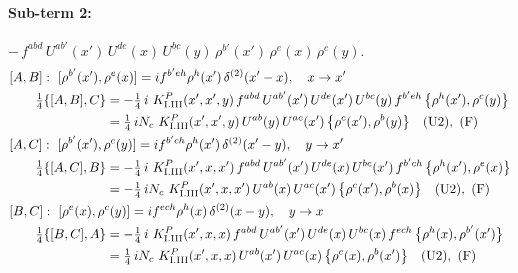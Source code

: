 \documentclass[10pt]{article}
\numberwithin{equation}{section}
\begin{document}
\paragraph{Sub-term 2:} $-\,f^{abd}\,U^{ab'}(x')\,U^{de}(x)\,U^{bc}(y)\,\rho^{b'}(x')\,\rho^{e}(x)\,\rho^{c}(y)$.
\begin{align}
&[A,B]:\ [\rho^{b'}(x'),\rho^{e}(x)]=i f^{b'eh}\rho^{h}(x')\,\delta^{(2)}(x'-x),\quad x\to x'\notag\\
&\qquad \tfrac14\{[A,B],C\}=-\tfrac14\,i\,\,K^{P}_{\rm I.III}(x',x',y)\,f^{abd}\,U^{ab'}(x')\,U^{de}(x')\,U^{bc}(y)\,f^{b'eh}\,\big\{\rho^{h}(x'),\rho^{c}(y)\big\}\notag\\
&\qquad\phantom{\tfrac14\{[A,B],C\}}=\tfrac14\,i N_{c}\,\,K^{P}_{\rm I.III}(x',x',y)\,U^{ab}(y)\,U^{ac}(x')\,\big\{\rho^{c}(x'),\rho^{b}(y)\big\}\quad\text{(U2)},\ \text{(F)}
\label{B:eq:GI.III.P-2-AB}\\
&[A,C]:\ [\rho^{b'}(x'),\rho^{c}(y)]=i f^{b'ch}\rho^{h}(x')\,\delta^{(2)}(x'-y),\quad y\to x'\notag\\
&\qquad \tfrac14\{[A,C],B\}=-\tfrac14\,i\,\,K^{P}_{\rm I.III}(x',x,x')\,f^{abd}\,U^{ab'}(x')\,U^{de}(x)\,U^{bc}(x')\,f^{b'ch}\,\big\{\rho^{h}(x'),\rho^{e}(x)\big\}\notag\\
&\qquad\phantom{\tfrac14\{[A,C],B\}}=-\tfrac14\,i N_{c}\,\,K^{P}_{\rm I.III}(x',x,x')\,U^{ab}(x)\,U^{ac}(x')\,\big\{\rho^{c}(x'),\rho^{b}(x)\big\}\quad\text{(U2)},\ \text{(F)}
\label{B:eq:GI.III.P-2-AC}\\
&[B,C]:\ [\rho^{e}(x),\rho^{c}(y)]=i f^{ech}\rho^{h}(x)\,\delta^{(2)}(x-y),\quad y\to x\notag\\
&\qquad \tfrac14\{[B,C],A\}=-\tfrac14\,i\,\,K^{P}_{\rm I.III}(x',x,x)\,f^{abd}\,U^{ab'}(x')\,U^{de}(x)\,U^{bc}(x)\,f^{ech}\,\big\{\rho^{h}(x),\rho^{b'}(x')\big\}\notag\\
&\qquad\phantom{\tfrac14\{[B,C],A\}}=\tfrac14\,i N_{c}\,\,K^{P}_{\rm I.III}(x',x,x)\,U^{ab}(x')\,U^{ac}(x)\,\big\{\rho^{c}(x),\rho^{b}(x')\big\}\quad\text{(U2)},\ \text{(F)}
\label{B:eq:GI.III.P-2-BC}
\end{align}
\end{document}
